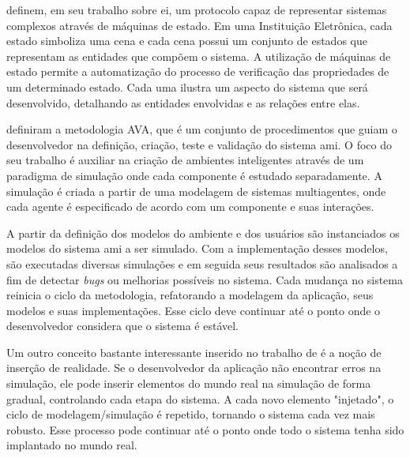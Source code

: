 
 definem,  em seu trabalho sobre \acrfull{ei}, um protocolo capaz de representar sistemas complexos através de máquinas de estado. Em uma Instituição Eletrônica, cada estado simboliza uma cena e cada cena possui um conjunto de estados que representam as entidades que compõem o sistema. A utilização de máquinas de estado permite a automatização do processo de verificação das propriedades de um determinado estado. Cada uma ilustra um aspecto do sistema que será desenvolvido, detalhando as entidades envolvidas e as relações entre elas. 


 definiram a metodologia AVA, que é um conjunto de procedimentos que guiam o desenvolvedor na definição, criação, teste e validação do sistema \acrshort{ami}.  O foco do seu trabalho é auxiliar na criação de ambientes inteligentes através de um paradigma de simulação onde cada componente é estudado separadamente. A simulação é criada a partir de uma modelagem de sistemas multiagentes, onde cada agente é especificado de acordo com um componente e suas interações.

A partir da definição dos modelos do ambiente e dos usuários são instanciados os modelos do sistema \acrshort{ami} a ser simulado. Com a implementação desses modelos, são executadas diversas simulações e em seguida seus resultados são analisados a fim de detectar \textit{bugs} ou melhorias possíveis no sistema. Cada mudança no sistema reinicia o ciclo da metodologia, refatorando a modelagem da aplicação, seus modelos e suas implementações. Esse ciclo deve continuar até o ponto onde o desenvolvedor considera que o sistema é estável. 

Um outro conceito bastante interessante inserido no trabalho de  é a noção de inserção de realidade. Se o desenvolvedor da aplicação não encontrar erros na simulação, ele pode inserir elementos do mundo real na simulação de forma gradual, controlando cada etapa do sistema. A cada novo elemento "injetado", o ciclo de modelagem/simulação é repetido, tornando o sistema cada vez mais robusto. Esse processo pode continuar até o ponto onde todo o sistema tenha sido implantado no mundo real. 

